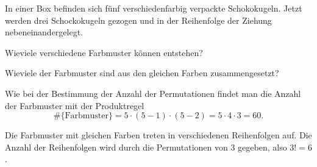In einer Box befinden sich fünf verschiedenfarbig verpackte Schokokugeln.
Jetzt werden drei Schockokugeln gezogen und in der Reihenfolge der Ziehung
nebeneinandergelegt.
\begin{teilaufgaben}
\item
Wieviele verschiedene Farbmuster können entstehen?
\item
Wieviele der Farbmuster sind aus den gleichen Farben zusammengesetzt?
\end{teilaufgaben}

\begin{loesung}
\begin{teilaufgaben}
\item
Wie bei der Bestimmung der Anzahl der Permutationen findet man die
Anzahl der Farbmuster mit der Produktregel
\[
\#\{\text{Farbmuster}\}
=
5\cdot(5-1)\cdot(5-2) = 5\cdot 4\cdot 3 = 60.
\]
\item
Die Farbmuster mit gleichen Farben treten in verschiedenen Reihenfolgen auf.
Die Anzahl der Reihenfolgen wird durch die Permutationen von 3 gegeben, also
$3!=6$.
\qedhere
\end{teilaufgaben}
\end{loesung}

